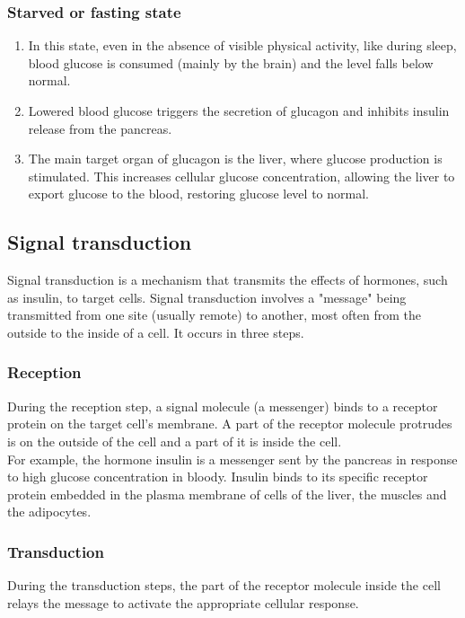 \documentclass[11pt]{article}
\begin{document}
\subsubsection{Starved or fasting state}
\label{sec:org1be8218}
\begin{enumerate}
\item In this state, even in the absence of visible physical activity, like during sleep, blood glucose is consumed (mainly by the brain) and the level falls below normal.
\item Lowered blood glucose triggers the secretion of glucagon and inhibits insulin release from the pancreas.
\item The main target organ of glucagon is the liver, where glucose production is stimulated. This increases cellular glucose concentration, allowing the liver to export glucose to the blood, restoring glucose level to normal.
\end{enumerate}

\newpage

\subsection{Signal transduction}
\label{sec:org8fbbb04}
Signal transduction is a mechanism that transmits the effects of hormones, such as insulin, to target cells. Signal transduction involves a "message" being transmitted from one site (usually remote) to another, most often from the outside to the inside of a cell. It occurs in three steps.

\subsubsection{Reception}
\label{sec:orgdcd3941}
During the reception step, a signal molecule (a messenger) binds to a receptor protein on the target cell's membrane. A part of the receptor molecule protrudes is on the outside of the cell and a part of it is inside the cell.
\\[0pt]

For example, the hormone insulin is a messenger sent by the pancreas in response to high glucose concentration in bloody. Insulin binds to its specific receptor protein embedded in the plasma membrane of cells of the liver, the muscles and the adipocytes.

\subsubsection{Transduction}
\label{sec:orgf9286f0}
During the transduction steps, the part of the receptor molecule inside the cell relays the message to activate the appropriate cellular response.
\\[0pt]
\end{document}
